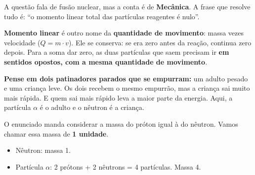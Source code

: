 \begin{enunciado}

\end{enunciado}


\begin{ideia}
A questão fala de fusão nuclear, mas a conta é de \textbf{Mecânica}. A frase que resolve tudo é:
``o momento linear total das partículas reagentes é nulo''.

\textbf{Momento linear} é outro nome da \textbf{quantidade de movimento}: massa vezes velocidade ($Q = m \cdot v$).
Ele se conserva: se era zero antes da reação, continua zero depois. Para a soma dar zero, as duas partículas que saem
precisam ir \textbf{em sentidos opostos, com a mesma quantidade de movimento}.

\textbf{Pense em dois patinadores parados que se empurram:} um adulto pesado e uma criança leve. Os dois recebem o
mesmo empurrão, mas a criança sai muito mais rápida. E quem sai mais rápido leva a maior parte da energia.
Aqui, a partícula $\alpha$ é o adulto e o nêutron é a criança.

\begin{center}
\end{center}
\end{ideia}

\passoapasso
{}
O enunciado manda considerar a massa do próton igual à do nêutron. Vamos chamar essa massa de \textbf{1 unidade}.
\begin{itemize}
  \item Nêutron: massa 1.
  \item Partícula $\alpha$: 2 prótons + 2 nêutrons = 4 partículas. Massa 4.
\end{itemize}

